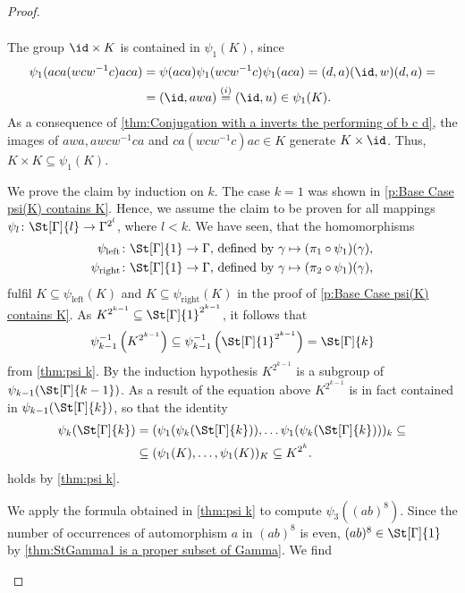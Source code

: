 \begin{proof}
\begin{plist}
\begin{align*}
\end{align*}
The group $\id\times K$ is contained in $\psi_1(K)$, since
\begin{align*}
\psi_1(aca(wcw^{-1}c)aca)	&=\psi(aca)\psi_1(wcw^{-1}c)\psi_1(aca)=(d,a)(\id,w)(d,a)=\\
							&=(\id,awa)\overset{(i)}{=}(\id,u)\in\psi_1(K).
\end{align*}
As a consequence of \cref{thm:Conjugation with a inverts the performing of b c d}, the images of $awa,awcw^{-1}ca$ and $ca(wcw^{-1}c)ac\in K$ generate $K\times\id$. Thus, $K\times K\subseteq\psi_1(K)$.
\item We prove the claim by induction on $k$. The case $k=1$ was shown in \ref{p:Base Case psi(K) contains K}. Hence, we assume the claim to be proven for all mappings $\psi_l\colon\St[\Gamma]{l}\to\Gamma^{2^l}$, where $l<k$. We have seen, that the homomorphisms
\begin{align*}
\psi_{\text{left}}\colon \St[\Gamma]{1}\to \Gamma,&\text{ defined by }\gamma\mapsto(\pi_1\circ\psi_1)(\gamma),\\
\psi_{\text{right}}\colon \St[\Gamma]{1}\to \Gamma,&\text{ defined by }\gamma\mapsto(\pi_2\circ\psi_1)(\gamma),
\end{align*}
fulfil $K\subseteq\psi_{\text{left}}(K)$ and $K\subseteq\psi_{\text{right}}(K)$ in the proof of \ref{p:Base Case psi(K) contains K}. As $K^{2^{k-1}}\subseteq\St[\Gamma]{1}^{2^{k-1}}$, it follows that
\begin{equation*}
\psi_{k-1}^{-1}\left(K^{2^{k-1}}\right)\subseteq \psi_{k-1}^{-1}\left(\St[\Gamma]{1}^{2^{k-1}}\right)=\St[\Gamma]{k}
\end{equation*}
from \cref{thm:psi k}. By the induction hypothesis $K^{2^{k-1}}$ is a subgroup of $\psi_{k-1}(\St[\Gamma]{k-1})$. As a result of the equation above $K^{2^{k-1}}$ is in fact contained in $\psi_{k-1}(\St[\Gamma]{k})$, so that the identity 
\begin{align*}
\psi_{k}(\St[\Gamma]{k})	&=(\psi_{1}(\psi_{k}(\St[\Gamma]{k})),\ldots\psi_{1}(\psi_{k}(\St[\Gamma]{k})))_k\subseteq\\
						&\subseteq(\psi_{1}(K),\ldots,\psi_{1}(K))_K\subseteq K^{2^k}.
\end{align*}
holds by \cref{thm:psi k}.
\item We apply the formula obtained in \cref{thm:psi k} to compute $\psi_3((ab)^8)$. Since the number of occurrences of automorphism $a$ in $(ab)^8$ is even, $(ab)^8\in\St[\Gamma]{1}$ by \cref{thm:StGamma1 is a proper subset of Gamma}. We find
\begin{equation*}

\end{equation*}
\end{plist}
\end{proof}
